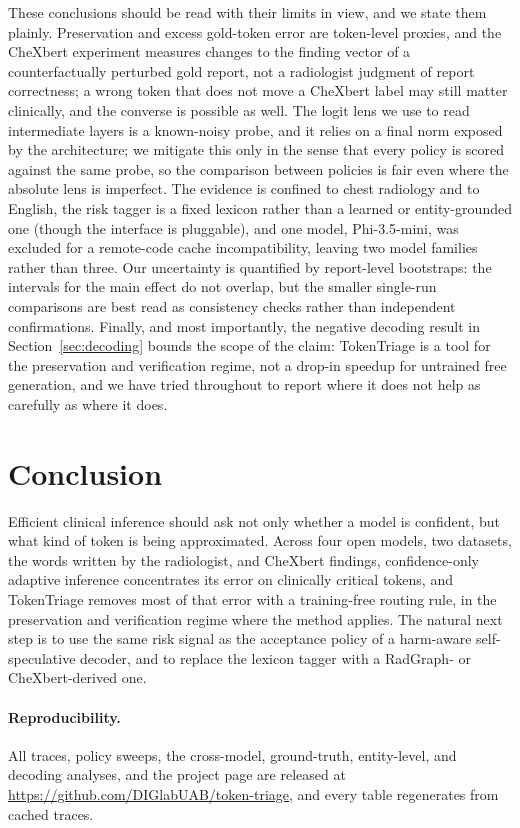 \documentclass[11pt]{article}
\newcommand{\method}{\mbox{TokenTriage}}
\newcommand{\repoURL}{\url{https://github.com/DIGlabUAB/token-triage}}
\begin{document}
These conclusions should be read with their limits in view, and we state them plainly. Preservation
and excess gold-token error are token-level proxies, and the CheXbert experiment measures changes to
the finding vector of a counterfactually perturbed gold report, not a radiologist judgment of report
correctness; a wrong token that does not move a CheXbert label may still matter clinically, and the
converse is possible as well. The logit lens we use to read intermediate layers is a known-noisy
probe, and it relies on a final norm exposed by the architecture; we mitigate this only in the sense
that every policy is scored against the same probe, so the comparison between policies is fair even
where the absolute lens is imperfect. The evidence is confined to chest radiology and to English, the
risk tagger is a fixed lexicon rather than a learned or entity-grounded one (though the interface is
pluggable), and one model, Phi-3.5-mini, was excluded for a remote-code cache incompatibility, leaving
two model families rather than three. Our uncertainty is quantified by report-level bootstraps: the
intervals for the main effect do not overlap, but the smaller single-run comparisons are best read as
consistency checks rather than independent confirmations. Finally, and most importantly, the negative
decoding result in Section~\ref{sec:decoding} bounds the scope of the claim: \method{} is a tool for
the preservation and verification regime, not a drop-in speedup for untrained free generation, and we
have tried throughout to report where it does not help as carefully as where it does.

\section{Conclusion}
Efficient clinical inference should ask not only whether a model is confident, but what kind of token is
being approximated. Across four open models, two datasets, the words written by the radiologist, and CheXbert
findings, confidence-only adaptive inference concentrates its error on clinically critical tokens, and
\method{} removes most of that error with a training-free routing rule, in the preservation and
verification regime where the method applies. The natural next step is to use the same risk signal as
the acceptance policy of a harm-aware self-speculative decoder, and to replace the lexicon tagger with a
RadGraph- or CheXbert-derived one.

\paragraph{Reproducibility.}
All traces, policy sweeps, the cross-model, ground-truth, entity-level, and decoding analyses, and the
project page are released at \repoURL{}, and every table regenerates from cached traces.



\end{document}

